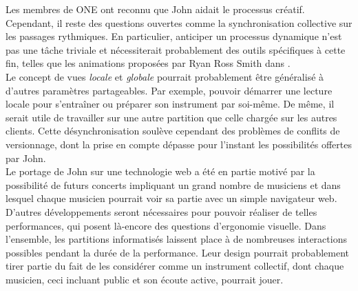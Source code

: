 \noindent Les membres de ONE ont reconnu que John aidait le processus créatif. Cependant, il reste des questions ouvertes comme la synchronisation collective sur les passages rythmiques. En particulier, anticiper un processus dynamique n'est pas une tâche triviale et nécessiterait probablement des outils spécifiques à cette fin, telles que les animations proposées par Ryan Ross Smith dans \cite{smith_atomic_2015}.\\
\indent Le concept de vues \textit{locale} et \textit{globale} pourrait probablement être généralisé à d'autres paramètres partageables. Par exemple, pouvoir démarrer une lecture locale pour s'entraîner ou préparer son instrument par soi-même. De même, il serait utile de travailler sur une autre partition que celle chargée sur les autres clients. Cette désynchronisation soulève cependant des problèmes de conflits de versionnage, dont la prise en compte dépasse pour l'instant les possibilités offertes par John.\\
\indent Le portage de John sur une technologie web a été en partie motivé par la possibilité de futurs concerts impliquant un grand nombre de musiciens et dans lesquel chaque musicien pourrait voir sa partie avec un simple navigateur web. D'autres développements seront nécessaires pour pouvoir réaliser de telles performances, qui posent là-encore des questions d'ergonomie visuelle.
\indent Dans l'ensemble, les partitions informatisés laissent place à de nombreuses interactions possibles pendant la durée de la performance. Leur design pourrait probablement tirer partie du fait de les considérer comme un instrument collectif, dont chaque musicien, ceci incluant public et son écoute active, pourrait jouer.
